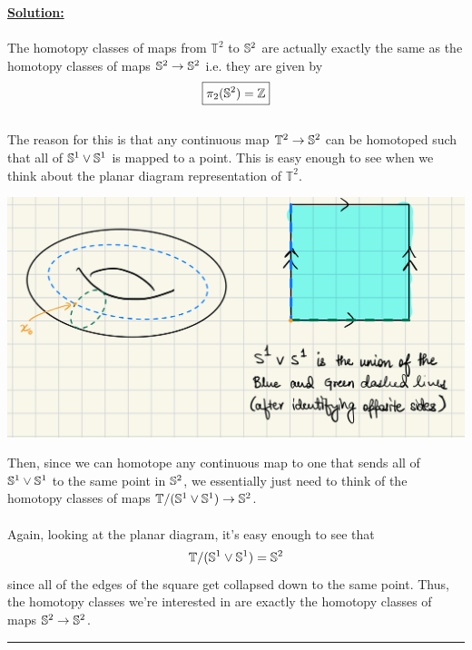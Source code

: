 \documentclass[11pt]{article}
\begin{document}
\vskip 0.5cm
\textbf{\underline{Solution:}}
\\
\\
The homotopy classes of maps from $\mathbb{T}^2$ to $\mathbb{S}^2$ are actually exactly the same as the homotopy classes of maps $\mathbb{S}^2 \rightarrow \mathbb{S}^2$ i.e. they are given by $$\boxed{\pi_2(\mathbb{S}^2) = \mathbb{Z}}$$
\\
The reason for this is that any continuous map $\mathbb{T}^2 \rightarrow \mathbb{S}^2$ can be homotoped such that all of $\mathbb{S}^1 \vee \mathbb{S}^1$ is mapped to a point. This is easy enough to see when we think about the planar diagram representation of $\mathbb{T}^2$.
\begin{center}
  \includegraphics*[scale=0.15]{Torus 215A HW8 Q3.png}
\end{center} Then, since we can homotope any continuous map to one that sends all of $\mathbb{S}^1 \vee \mathbb{S}^1$ to the same point in $\mathbb{S}^2$, we essentially just need to think of the homotopy classes of maps $\mathbb{T}/(\mathbb{S}^1 \vee \mathbb{S}^1) \rightarrow \mathbb{S}^2$.
\\
\\
Again, looking at the planar diagram, it's easy enough to see that $$ \mathbb{T}/(\mathbb{S}^1 \vee \mathbb{S}^1) = \mathbb{S}^2 $$ since all of the edges of the square get collapsed down to the same point. Thus, the homotopy classes we're interested in are exactly the homotopy classes of maps $\mathbb{S}^2 \rightarrow \mathbb{S}^2$.
\vskip 0.5cm
\hrule
\pagebreak


















% 
\end{document}
